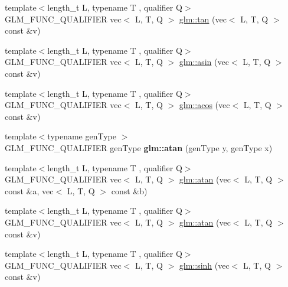 \begin{DoxyCompactItemize}
\item 
{\footnotesize template$<$length\+\_\+t L, typename T , qualifier Q$>$ }\\G\+L\+M\+\_\+\+F\+U\+N\+C\+\_\+\+Q\+U\+A\+L\+I\+F\+I\+ER vec$<$ L, T, Q $>$ \hyperlink{group__core__func__trigonometric_ga293a34cfb9f0115cc606b4a97c84f11f}{glm\+::tan} (vec$<$ L, T, Q $>$ const \&v)
\item 
{\footnotesize template$<$length\+\_\+t L, typename T , qualifier Q$>$ }\\G\+L\+M\+\_\+\+F\+U\+N\+C\+\_\+\+Q\+U\+A\+L\+I\+F\+I\+ER vec$<$ L, T, Q $>$ \hyperlink{group__core__func__trigonometric_ga0552d2df4865fa8c3d7cfc3ec2caac73}{glm\+::asin} (vec$<$ L, T, Q $>$ const \&v)
\item 
{\footnotesize template$<$length\+\_\+t L, typename T , qualifier Q$>$ }\\G\+L\+M\+\_\+\+F\+U\+N\+C\+\_\+\+Q\+U\+A\+L\+I\+F\+I\+ER vec$<$ L, T, Q $>$ \hyperlink{group__core__func__trigonometric_gacc9b092df8257c68f19c9053703e2563}{glm\+::acos} (vec$<$ L, T, Q $>$ const \&v)
\item 
\mbox{\label{func__trigonometric_8inl_a29204e55958a4011bfd1a6df7129984b}} 
{\footnotesize template$<$typename gen\+Type $>$ }\\G\+L\+M\+\_\+\+F\+U\+N\+C\+\_\+\+Q\+U\+A\+L\+I\+F\+I\+ER gen\+Type {\bfseries glm\+::atan} (gen\+Type y, gen\+Type x)
\item 
{\footnotesize template$<$length\+\_\+t L, typename T , qualifier Q$>$ }\\G\+L\+M\+\_\+\+F\+U\+N\+C\+\_\+\+Q\+U\+A\+L\+I\+F\+I\+ER vec$<$ L, T, Q $>$ \hyperlink{group__core__func__trigonometric_gac61629f3a4aa14057e7a8cae002291db}{glm\+::atan} (vec$<$ L, T, Q $>$ const \&a, vec$<$ L, T, Q $>$ const \&b)
\item 
{\footnotesize template$<$length\+\_\+t L, typename T , qualifier Q$>$ }\\G\+L\+M\+\_\+\+F\+U\+N\+C\+\_\+\+Q\+U\+A\+L\+I\+F\+I\+ER vec$<$ L, T, Q $>$ \hyperlink{group__core__func__trigonometric_ga5229f087eaccbc466f1c609ce3107b95}{glm\+::atan} (vec$<$ L, T, Q $>$ const \&v)
\item 
{\footnotesize template$<$length\+\_\+t L, typename T , qualifier Q$>$ }\\G\+L\+M\+\_\+\+F\+U\+N\+C\+\_\+\+Q\+U\+A\+L\+I\+F\+I\+ER vec$<$ L, T, Q $>$ \hyperlink{group__core__func__trigonometric_gac7c39ff21809e281552b4dbe46f4a39d}{glm\+::sinh} (vec$<$ L, T, Q $>$ const \&v)
\item 

\end{DoxyCompactItemize}
